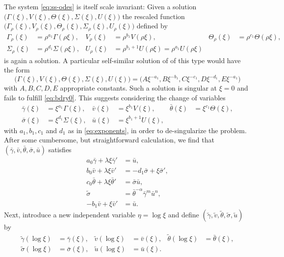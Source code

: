 \documentclass[a4paper,11pt]{article}
\def\bg{{\bar{\gamma}}}
\def\bv{{\bar{v}}}
\def\bth{{\bar{\theta}}}
\def\bs{{\bar{\sigma}}}
\def\bu{{\bar{u}}}
\def\tg{{\tilde{\gamma}}}
\def\tv{{\tilde{v}}}
\def\tth{{\tilde{\theta}}}
\def\ts{{\tilde{\sigma}}}
\def\tu{{\tilde{u}}}
\theoremstyle{remark}
\begin{document}
The system \eqref{eq:ss-odes} is itself scale invariant: Given a solution $\big(\Gamma(\xi), V(\xi), \Theta(\xi), \Sigma(\xi), U(\xi)\big)$ the rescaled
function $\big(\Gamma_\rho(\xi), V_\rho(\xi), \Theta_\rho(\xi), \Sigma_\rho(\xi), U_\rho(\xi)\big)$ defined by
\begin{equation}
\label{selfsimilardef2}
\begin{aligned}
 \Gamma_\rho(\xi)&=\rho^{a_1}\Gamma(\rho\xi), & V_\rho(\xi)&=\rho^{b_1}V(\rho\xi), & \Theta_\rho(\xi)&=\rho^{c_1}\Theta(\rho\xi),\\
 \Sigma_\rho(\xi)&=\rho^{d_1}\Sigma(\rho\xi), & U_\rho(\xi)&=\rho^{b_1+1}U(\rho\xi)=\rho^{a_1}U(\rho\xi)
\end{aligned}
\end{equation}
is again a solution. 
A particular self-similar solution of of this type would have the form
 $$\big(\Gamma(\xi), V(\xi), \Theta(\xi), \Sigma(\xi), U(\xi)\big)=\big(A\xi^{-a_1}, B\xi^{-b_1},C\xi^{-c_1},D\xi^{-d_1},E\xi^{-a_1}\big)$$ 
with $A, B, C, D, E$ appropriate constants. Such a solution is singular at $\xi =0$ and fails to fulfill \eqref{eq:bdry0}. This suggests considering the change of variables
\begin{equation} \label{eq:CAPtoBAR}
\begin{aligned}
 \bg(\xi)&=\xi^{a_1}\Gamma(\xi), &
 \bv(\xi)&=\xi^{b_1}V(\xi), &
 \bth(\xi)&=\xi^{c_1}\Theta(\xi), \\
 \bs(\xi)&=\xi^{d_1}\Sigma(\xi), &
 \bu(\xi)&=\xi^{b_1+1}U(\xi) ,
\end{aligned}
\end{equation}
with $a_1, b_1, c_1$ and $d_1$ as in \eqref{eq:exponents}, in order to de-singularize the problem.
After some cumbersome, but straightforward calculation, we find that $(\bg,\bv,\bth,\bs,\bu)$ satisfies
\begin{equation} \label{eq:barsys}
 \begin{aligned}
  a_0\bg + \lambda\xi\bg' &=\bu,\\
  b_0\bv + \lambda\xi\bv' &=-d_1 \bs + \xi\bs',\\
  c_0\bth+ \lambda\xi\bth'&=\bs\bu,\\
  \ts &=\bth^{-\alpha}\bg^m\bu^n,\\
  -b_1\bv+\xi\bv' &= \bu.
 \end{aligned}
\end{equation}
Next, introduce a new independent variable $\eta = \log\xi$ and define $(\tg,\tv,\tth,\ts,\tu)$ by
\begin{equation} \label{eq:BARtoTIL}
\begin{aligned}
 \tg(\log\xi)&=\bg(\xi), &
 \tv(\log\xi)&=\bv(\xi), &
 \tth(\log\xi)&=\bth(\xi), \\
 \ts(\log\xi)&=\bs(\xi), &
 \tu(\log\xi)&=\bu(\xi).
\end{aligned}
\end{equation}
\end{document}

